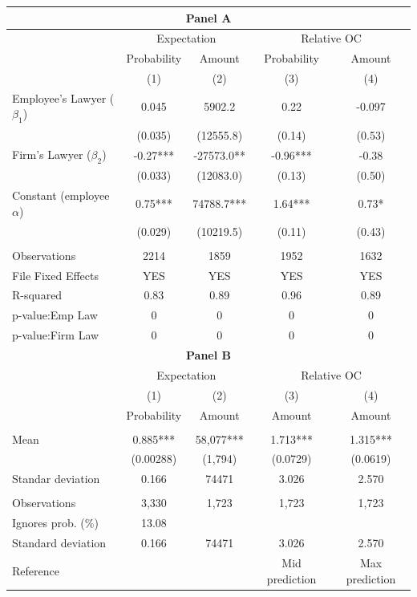 \begin{tabular}{lcccc}
\toprule
\toprule
\multicolumn{5}{c}{\textbf{Panel A}} \\
\midrule
      & \multicolumn{2}{c}{Expectation} & \multicolumn{2}{c}{Relative OC} \\
\midrule
\midrule
      & Probability & Amount & Probability & Amount \\
\midrule
      & (1)   & (2)   & (3)   & (4) \\
\midrule
\midrule
Employee's Lawyer ($\beta_1$) & 0.045 & 5902.2 & 0.22  & -0.097 \\
      & (0.035) & (12555.8) & (0.14) & (0.53) \\
Firm's Lawyer ($\beta_2$) & -0.27*** & -27573.0** & -0.96*** & -0.38 \\
      & (0.033) & (12083.0) & (0.13) & (0.50) \\
Constant (employee $\alpha$) & 0.75*** & 74788.7*** & 1.64*** & 0.73* \\
      & (0.029) & (10219.5) & (0.11) & (0.43) \\
      &       &       &       &  \\
\midrule
Observations & 2214  & 1859  & 1952  & 1632 \\
File Fixed Effects & YES   & YES   & YES   & YES \\
R-squared & 0.83  & 0.89  & 0.96  & 0.89 \\
p-value:Emp Law & 0     & 0     & 0     & 0 \\
p-value:Firm Law & 0     & 0     & 0     & 0 \\
\midrule
\midrule
\multicolumn{5}{c}{\textbf{Panel B}} \\
\midrule
      & \multicolumn{2}{c}{Expectation} & \multicolumn{2}{c}{Relative OC} \\
\midrule
\midrule
      & (1)   & (2)   & (3)   & (4) \\
\midrule
\midrule
      & Probability & Amount & Amount & Amount \\
      &       &       &       &  \\
Mean  & 0.885*** & 58,077*** & 1.713*** & 1.315*** \\
      & (0.00288) & (1,794) & (0.0729) & (0.0619) \\
Standar deviation & 0.166 & 74471 & 3.026 & 2.570 \\
      &       &       &       &  \\
\midrule
Observations & 3,330 & 1,723 & 1,723 & 1,723 \\
Ignores prob. (\%) & 13.08 &       &       &  \\
Standard deviation & 0.166 & 74471 & 3.026 & 2.570 \\
Reference &       &       & Mid prediction & Max prediction \\
\bottomrule
\bottomrule
\end{tabular}%
